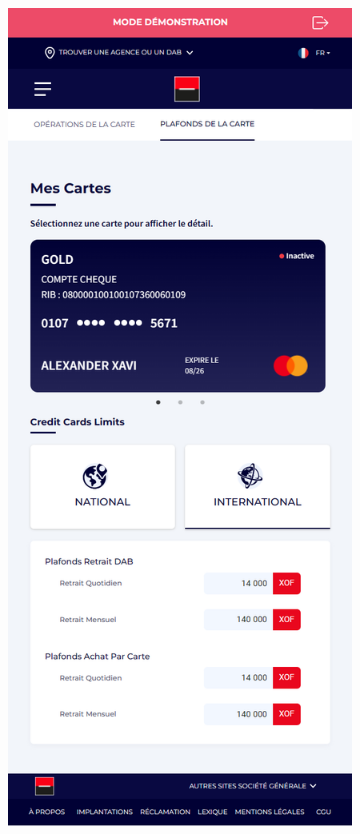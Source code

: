 \begin{figure}[!ht]
    \centering
    \begin{subfigure}[b]{0.49\textwidth}
        \centering
        \includegraphics[width=\textwidth]{images/screens/plafondsInter/mob.png}

\end{subfigure}
\end{figure}
